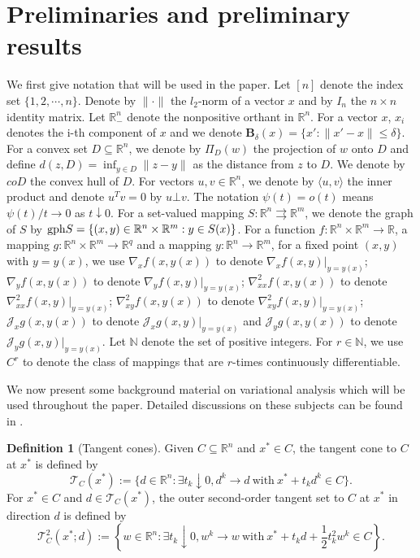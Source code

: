 \documentclass[11pt]{article}
\theoremstyle{definition}
\newtheorem{definition}[theorem]{Definition}
\theoremstyle{remark}
\numberwithin{equation}{section}
\begin{document}
\section{Preliminaries and preliminary results}\label{section 2}
We first give notation that will be used in the paper.
Let $[n]$ denote the index set $\{1,2,\cdots,n\}$.
Denote by $\|\cdot\|$ the  $l_2$-norm of a vector $x$ and by $I_{n}$ the $n\times n$
identity matrix.  Let $\mathbb{R}^n_{-}$ denote the nonpositive orthant in $\mathbb{R}^n$.
 For a vector $x$, $x_i$ denotes the i-th component of  $x$ and we denote
 $\boldsymbol{B}_{\delta}(x)=\{x':\parallel x'-x\parallel\le \delta\}$.
  For a convex set $D\subseteq
 \mathbb{R}^n$, we denote by $\Pi_D(w)$ the projection of $w$ onto $D$ and define $d(z,D)=\inf_{y\in D}\|z-y\|$ as
 the distance from $z$ to $D$. We denote by $coD$ the convex
hull of $D$. For vectors $u,v\in \mathbb{R}^n$, we denote by $\langle u,v\rangle$ the inner product and denote
$u^Tv=0$ by $u\bot v$.
The notation $\psi (t)=o(t)$
means  $\psi(t)/t\to0$ as $t\downarrow 0$.
   For a set-valued mapping $S:\mathbb{R}^n \rightrightarrows\mathbb{R}^m $,
  we denote the graph of $S$ by
${\rm gph} S=\{(x,y)\in \mathbb{R}^n \times \mathbb{R}^m: y\in S(x)\}$.
 For a function $f :\mathbb{R}^n \times \mathbb{R}^m \to \mathbb{R} $, a mapping $g :\mathbb{R}^n \times
 \mathbb{R}^m \to \mathbb{R}^q $ and a mapping $y:\mathbb{R}^n\to \mathbb{R}^m$,
 for a fixed point $(x,y)$ with $y=y(x)$, we use $\nabla_x f(x,y(x))$ to denote $\nabla_x f(x,y)|_{y=y(x)}$;
 $\nabla_y f(x,y(x))$ to denote $\nabla_y f(x,y)|_{y=y(x)}$; $\nabla_{xx}^2 f(x,y(x))$ to denote $\nabla_{xx}^2
 f(x,y)|_{y=y(x)}$;  $\nabla_{xy}^2 f(x,y(x))$ to denote $\nabla_{xy}^2 f(x,y)|_{y=y(x)}$;
 $ \mathcal{J}_x g(x,y(x))$ to denote $\mathcal{J}_x g(x,y)|_{y=y(x)}$ and $ \mathcal{J}_y g(x,y(x))$ to denote
 $\mathcal{J}_y g(x,y)|_{y=y(x)}$.
  Let $\mathbb{N}$ denote the set of positive integers. For  $r\in \mathbb{N}$, we use $C^r$ to denote the class of mappings that are
$r$-times continuously differentiable.



We now present some background material on variational analysis which will be used throughout the paper.
Detailed discussions on these subjects can be found in \cite{Bonnans,Rockafellar}.


\begin{definition}[Tangent cones]
   Given $C\subseteq \mathbb{R}^n$ and $x^*\in C$, the tangent cone to $C$ at $x^*$ is defined by
$$\mathcal{T}_{C}(x^*):=\{d\in \mathbb{R}^n:\exists t_k\downarrow 0, d^k\to d~ \text{with}~x^*+t_kd^k\in C \}.$$
For $x^*\in C$ and $d\in \mathcal{T}_{C}(x^*)$, the outer second-order tangent set to $C$ at $x^*$ in direction
$d$ is defined by
$$\mathcal{T}_{C}^2(x^*;d):=\left\{w\in \mathbb{R}^n:\exists t_k\downarrow 0, w^k\to w~
\text{with}~x^*+t_kd+\frac{1}{2}t_k^2w^k\in C \right\}.$$
\end{definition}
\end{document}

